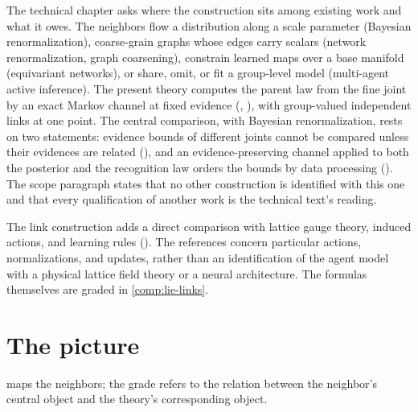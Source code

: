 The technical chapter asks where the construction sits among existing work and what it owes. The
neighbors flow a distribution along a scale parameter (Bayesian renormalization), coarse-grain graphs
whose edges carry scalars (network renormalization, graph coarsening), constrain learned maps over a base
manifold (equivariant networks), or share, omit, or fit a group-level model (multi-agent active
inference). The present theory computes the parent law from the fine joint by an exact Markov channel at
fixed evidence (, ), with group-valued
independent links at one point. The central comparison, with Bayesian renormalization, rests on two
statements: evidence bounds of different joints cannot be compared unless their evidences are related
(), and an evidence-preserving channel applied to both the posterior
and the recognition law orders the bounds by data processing ().
The scope paragraph states that no other construction is identified with this one and that every
qualification of another work is the technical text's reading.

The link construction adds a direct comparison with lattice gauge theory, induced actions, and
learning rules (). The references concern particular actions,
normalizations, and updates, rather than an identification of the agent model with a physical
lattice field theory or a neural architecture. The formulas themselves are graded in
\cref{comp:lie-links}.

\section{The picture}
\label{comp:ch15-picture}

 maps the neighbors; the grade refers to the relation between the neighbor's
central object and the theory's corresponding object.

